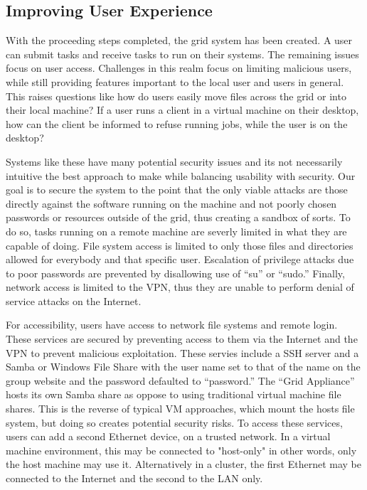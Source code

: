 \documentclass[conference]{IEEEtran}
\begin{document}
\subsection{Improving User Experience}

With the proceeding steps completed, the grid system has been created.  A user
can submit tasks and receive tasks to run on their systems.  The remaining
issues focus on user access.  Challenges in this realm focus on limiting
malicious users, while still providing features important to the local user and
users in general.  This raises questions like how do users easily move files
across the grid or into their local machine?  If a user runs a client in a
virtual machine on their desktop, how can the client be informed to refuse
running jobs, while the user is on the desktop?

Systems like these have many potential security issues and its not necessarily
intuitive the best approach to make while balancing usability with security.
Our goal is to secure the system to the point that the only viable attacks are
those directly against the software running on the machine and not poorly
chosen passwords or resources outside of the grid, thus creating a sandbox of
sorts.  To do so, tasks running on a remote machine are severly limited in what
they are capable of doing.  File system access is limited to only those files
and directories allowed for everybody and that specific user.  Escalation of
privilege attacks due to poor passwords are prevented by disallowing use of
``su'' or ``sudo.'' Finally, network access is limited to the VPN, thus they
are unable to perform denial of service attacks on the Internet.

For accessibility, users have access to network file systems and remote login.
These services are secured by preventing access to them via the Internet and
the VPN to prevent malicious exploitation.  These servies include a SSH server
and a Samba or Windows File Share with the user name set to that of the name on
the group website and the password defaulted to ``password.'' The ``Grid
Appliance'' hosts its own Samba share as oppose to using traditional virtual
machine file shares.  This is the reverse of typical VM approaches, which mount
the hosts file system, but doing so creates potential security risks.  To
access these services, users can add a second Ethernet device, on a trusted
network.  In a virtual machine environment, this may be connected to
"host-only" in other words, only the host machine may use it.  Alternatively in
a cluster, the first Ethernet may be connected to the Internet and the second
to the LAN only.
\end{document}
